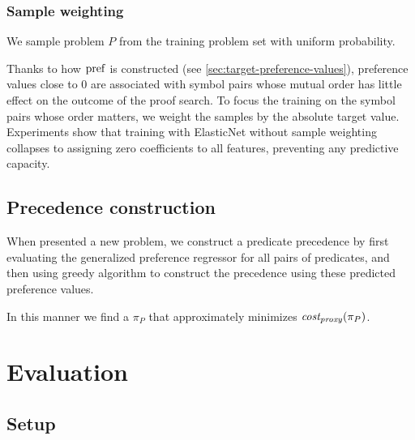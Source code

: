 \subsubsection{Sample weighting}

We sample problem \(P\) from the training problem set with uniform probability.

Thanks to how \(\operatorname{pref}\) is constructed (see \autoref{sec:target-preference-values}),
preference values close to 0 are associated with symbol pairs whose mutual order has little effect
on the outcome of the proof search.
To focus the training on the symbol pairs whose order matters,
we weight the samples by the absolute target value.
Experiments show that training with ElasticNet without sample weighting
collapses to assigning zero coefficients to all features,
preventing any predictive capacity.



\subsection{Precedence construction}

When presented a new problem, we construct a predicate precedence by
first evaluating the generalized preference regressor for all pairs of predicates,
and then using greedy algorithm to construct the precedence using these predicted preference values.

In this manner we find a \(\pi_P\) that approximately minimizes \(\operatorname{\mathit{cost_{proxy}}}(\pi_P)\).

\section{Evaluation}
\label{sec:evaluation}

\subsection{Setup}


